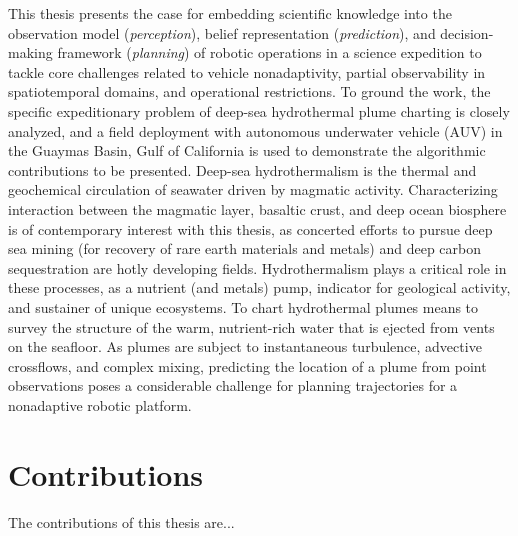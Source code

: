 This thesis presents the case for embedding scientific knowledge into the observation model (\emph{perception}), belief representation (\emph{prediction}), and decision-making framework (\emph{planning}) of robotic operations in a science expedition to tackle core challenges related to vehicle nonadaptivity, partial observability in spatiotemporal domains, and operational restrictions. 
To ground the work, the specific expeditionary problem of deep-sea hydrothermal plume charting is closely analyzed, and a field deployment with autonomous underwater vehicle (AUV) \Sentry in the Guaymas Basin, Gulf of California is used to demonstrate the algorithmic contributions to be presented.
Deep-sea hydrothermalism is the thermal and geochemical circulation of seawater driven by magmatic activity.
Characterizing interaction between the magmatic layer, basaltic crust, and deep ocean biosphere is of contemporary interest with this thesis, as concerted efforts to pursue deep sea mining (for recovery of rare earth materials and metals) and deep carbon sequestration are hotly developing fields.
Hydrothermalism plays a critical role in these processes, as a nutrient (and metals) pump, indicator for geological activity, and sustainer of unique ecosystems.
To chart hydrothermal plumes means to survey the structure of the warm, nutrient-rich water that is ejected from vents on the seafloor.
As plumes are subject to instantaneous turbulence, advective crossflows, and complex mixing, predicting the location of a plume from point observations poses a considerable challenge for planning trajectories for a nonadaptive robotic platform.
 


\section{Contributions}
The contributions of this thesis are...

